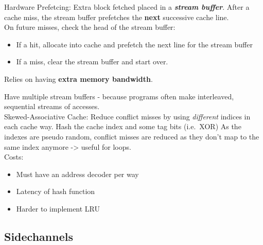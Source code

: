 \documentclass[a4paper, 5pt, twocolumn]{article}
\begin{document}
Hardware Prefetcing: Extra block fetched placed in a
\textbf{\emph{stream buffer}}. After a cache miss, the stream buffer
prefetches the \textbf{next} successive cache line. \\

On future misses, check the head of the stream buffer: 
\begin{itemize}[topsep=0pt,itemsep=-1ex,partopsep=1ex,parsep=1ex]
	\item If a hit, allocate into cache and prefetch the next line for the stream buffer
 	\item If a miss, clear the stream buffer and start over. \\
\end{itemize}
Relies on having \textbf{extra memory bandwidth}.

Have multiple stream buffers - because programs often make interleaved,
sequential streams of accesses. \\

Skewed-Associative Cache: Reduce conflict misses by using
\emph{different} indices in each cache way. Hash the cache index and
some tag bits (i.e.~XOR) As the indexes are pseudo random, conflict
misses are reduced as they don't map to the same index anymore
-\textgreater{} useful for loops. \\

Costs:
\begin{itemize}[topsep=0pt,itemsep=-1ex,partopsep=1ex,parsep=1ex]
	\item Must have an address decoder per way 
	\item Latency of hash function
	\item Harder to implement LRU \\
\end{itemize}

\hypertarget{sidechannels}{%
\subsection{Sidechannels}\label{sidechannels}}
\end{document}
